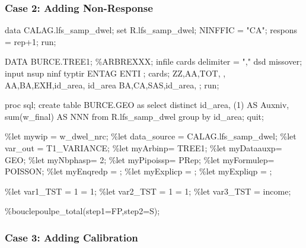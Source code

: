 \documentclass[
]{article}
\newenvironment{Shaded}{\begin{snugshade}}{\end{snugshade}}
\newcommand{\NormalTok}[1]{#1}
\begin{document}
\subsubsection{Case 2: Adding
Non-Response}\label{case-2-adding-non-response-1}

\begin{Shaded}
\begin{Highlighting}[]
\NormalTok{data CALAG.lfs\_samp\_dwel; set R.lfs\_samp\_dwel;}
\NormalTok{NINFFIC = "CA";}
\NormalTok{respons = rep+1;}
\NormalTok{run;}

\NormalTok{DATA BURCE.TREE1;   }
\NormalTok{\%ARBREXXX;}
\NormalTok{infile cards delimiter = "," dsd missover;}
\NormalTok{input nsup ninf typtir ENTAG ENTI ;}
\NormalTok{cards;   }
\NormalTok{ZZ,AA,TOT, ,   }
\NormalTok{AA,BA,EXH,id\_area, id\_area}
\NormalTok{BA,CA,SAS,id\_area,}
\NormalTok{;}
\NormalTok{run;}

\NormalTok{proc sql;}
\NormalTok{create table BURCE.GEO as select distinct}
\NormalTok{    id\_area, (1) AS Auxniv, sum(w\_final) AS NNN}
\NormalTok{from R.lfs\_samp\_dwel group by id\_area;}
\NormalTok{quit;}

\NormalTok{\%let mywip = w\_dwel\_nrc;}
\NormalTok{\%let data\_source = CALAG.lfs\_samp\_dwel;}
\NormalTok{\%let var\_out = T1\_VARIANCE;}
\NormalTok{\%let myArbinp=  TREE1;}
\NormalTok{\%let myDataauxp= GEO;}
\NormalTok{\%let myNbphasp=  2;}
\NormalTok{\%let myPipoissp= PRep;}
\NormalTok{\%let myFormulep= POISSON;}
\NormalTok{\%let myEnqredp = ;}
\NormalTok{\%let myExplicp = ;}
\NormalTok{\%let myExpliqp = ;}

\NormalTok{\%let var1\_TST = 1 = 1;}
\NormalTok{\%let var2\_TST = 1 = 1;}
\NormalTok{\%let var3\_TST = income;}

\NormalTok{\%bouclepoulpe\_total(step1=FP,step2=S);}
\end{Highlighting}
\end{Shaded}

\subsubsection{Case 3: Adding
Calibration}\label{case-3-adding-calibration-1}
\end{document}
